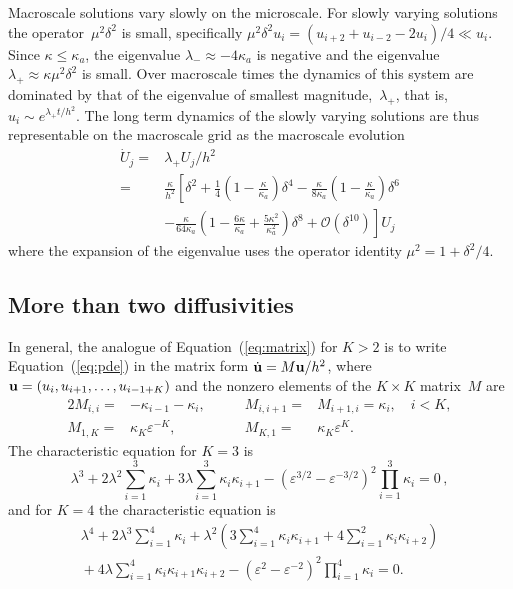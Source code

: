 \documentclass[12pt,a4paper]{article}
\begin{document}
Macroscale solutions vary slowly on the microscale. For slowly varying solutions the operator~$\mu^2\delta^2$ is small, specifically $\mu^2\delta^2u_i=(u_{i+2}+u_{i-2}-2u_i)/4\ll u_i$. Since $\kappa\leq \kappa_a$, the eigenvalue $\lambda_-\approx -4\kappa_a$ is negative and the eigenvalue $\lambda_+\approx \kappa\mu^2\delta^2$ is small. Over macroscale times the dynamics of this system are dominated by that of the eigenvalue of smallest magnitude,~$\lambda_+$, that is, $u_i\sim e^{\lambda_+ t/h^2}$. 
The long term dynamics of the slowly varying solutions are thus representable on the macroscale grid as the macroscale evolution
\begin{align}
\dot{U}_j=&\lambda_+U_j/h^2\nonumber\\
=&\frac{\kappa}{h^2}\left[\delta^2+\frac{1}{4}\left(1-\frac{\kappa}{\kappa_a}\right)\delta^4-\frac{\kappa}{8\kappa_a}\left(1-\frac{\kappa}{\kappa_a}\right)\delta^6\right.\nonumber\\
&{}\left.-\frac{\kappa}{64\kappa_a} \left(1-\frac{6\kappa}{\kappa_a}+\frac{5\kappa^2}{\kappa^2_a}\right)\delta^8+\mathcal O(\delta^{10})
\right]U_j\label{eq:g}
\end{align}
where the expansion of the eigenvalue uses the operator identity $\mu^2=1+\delta^2/4$. 

\subsection{More than two diffusivities}

In general, the analogue of Equation~(\ref{eq:matrix}) for $K>2$ is to write Equation~(\ref{eq:pde}) in the matrix form $\dot{{\bf u}}=M{\bf u}/h^2$, where ${\bf u}=(u_i,u_{i+1},\ldots,u_{i-1+K})$ and the nonzero elements of the $K\times K$ matrix~$M$ are
\begin{alignat}2
M_{i,i}=&-\kappa_{i-1}-\kappa_i,\qquad  &M_{i,i+1}=&M_{i+1,i}=\kappa_i,\quad i<K,\nonumber\\
M_{1,K}=&\kappa_K\varepsilon ^{-K},\qquad &M_{K,1}=&\kappa_K\varepsilon ^{K}.
\end{alignat}
The characteristic equation for $K=3$ is
\begin{equation}
\lambda^3+2\lambda^2\sum_{i=1}^3\kappa_i+3\lambda\sum_{i=1}^3\kappa_i\kappa_{i+1}-(\varepsilon ^{3/2}-\varepsilon ^{-3/2})^2\prod_{i=1}^3\kappa_i=0 \,,\label{eq:K3}
\end{equation}
and for $K=4$ the characteristic equation is
\begin{multline}
\lambda^4+2\lambda^3\sum_{i=1}^4\kappa_i+\lambda^2\left(3\sum_{i=1}^4\kappa_i\kappa_{i+1}+4\sum_{i=1}^2\kappa_i\kappa_{i+2}\right)\\
{}+4\lambda\sum_{i=1}^4\kappa_i\kappa_{i+1}\kappa_{i+2}-(\varepsilon ^{2}-\varepsilon ^{-2})^2\prod_{i=1}^4\kappa_i=0.
\label{eq:K4}
\end{multline}
\end{document}
